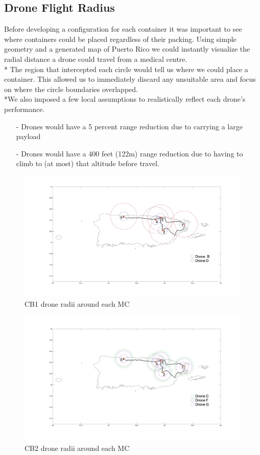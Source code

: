 \documentclass[a4paper,12pt]{article}
\begin{document}
\subsection{Drone Flight Radius}
Before developing a configuration for each container it was important to see where containers could be placed regardless of their packing.
Using simple geometry and a generated map of Puerto Rico we could instantly visualize the radial distance a drone could travel from a medical centre.\\*
The region that intercepted each circle would tell us where we could place a container. This allowed us to immediately discard any unsuitable area and focus on where the circle boundaries overlapped.
\\*We also imposed a few local assumptions to realistically reflect each drone's performance.

\begin{itemize}
\item[-]Drones would have a 5 percent range reduction due to carrying a large payload
\item[-]Drones would have a 400 feet (122m) range reduction due to having to climb to (at most) that altitude before travel.
\end{itemize}

\begin{figure}[p]
\centering
\includegraphics[scale =0.15]{CB1}
\caption{CB1 drone radii around each MC}
\label{cb1}
\end{figure}

\begin{figure}[p]
\centering
\includegraphics[scale =0.15]{CB2}
\caption{CB2 drone radii around each MC}
\label{cb2}
\end{figure}
\end{document}
